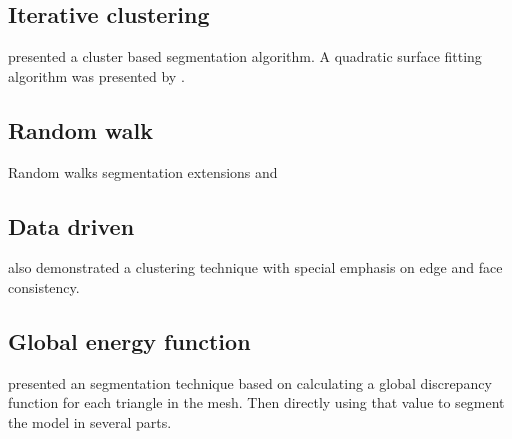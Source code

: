 


\subsection{Iterative clustering}

\cite{Lai2006} presented a cluster based segmentation algorithm.
A quadratic surface fitting algorithm was presented by \cite{Yan2012}.



\subsection{Random walk}

Random walks segmentation extensions \cite{Lai2008} and  \cite{Lai2009}

\subsection{Data driven}

\cite{Golovinskiy2009} also demonstrated a clustering technique with special emphasis on edge and face consistency.

\subsection{Global energy function}

\cite{DeCastro2014} presented an segmentation technique based on calculating a global discrepancy function for each triangle in the mesh.
Then directly using that value to segment the model in several parts. 

